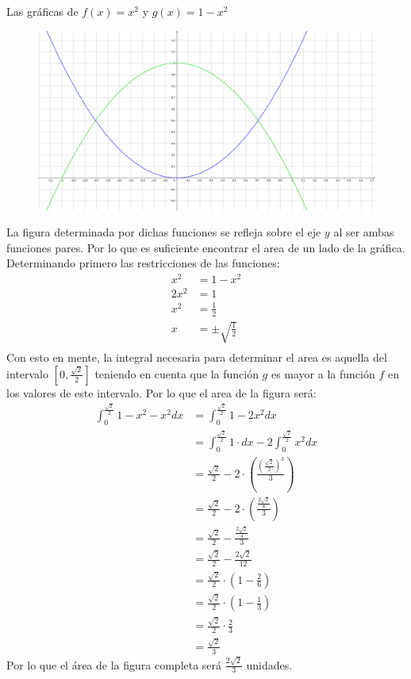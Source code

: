 \documentclass[../../main.tex]{subfiles}
\begin{document}
\begin{partes}
    \parte Las gráficas de $f(x) = x^2$ y $g(x) = 1-x^2$
    \begin{figure}[h]
        \centering
        \includegraphics[width=12cm]{Parte 1/grafica3.png}
    \end{figure} 
    La figura determinada por dichas funciones se refleja sobre el eje $y$ al ser ambas funciones pares. Por lo que es suficiente encontrar
    el area de un lado de la gráfica. Determinando primero las restricciones de las funciones:
    \begin{align*}
        x^2 &= 1-x^2\\
        2x^2 &= 1\\
        x^2 &= \frac{1}{2}\\
        x &= \pm \sqrt{\frac{1}{2}}\\
    \end{align*}
    Con esto en mente, la integral necesaria para determinar el area es aquella del intervalo $[0, \frac{\sqrt{2}}{2}]$ teniendo en cuenta que la función
    $g$ es mayor a la función $f$ en los valores de este intervalo. Por lo que el area de la figura será:
    \begin{align*}
        \int_{0}^{\frac{\sqrt{2}}{2}} 1- x^2 - x^2 dx &= \int_{0}^{\frac{\sqrt{2}}{2}} 1-2x^2 dx\\
        &= \int_{0}^{\frac{\sqrt{2}}{2}} 1 \cdot dx - 2\int_{0}^{\frac{\sqrt{2}}{2}} x^2 dx\\  
        &= \frac{\sqrt{2}}{2} - 2 \cdot \left(\frac{\left(\frac{\sqrt{2}}{2}\right)^3}{3}\right)\\
        &= \frac{\sqrt{2}}{2} - 2 \cdot \left(\frac{\frac{2\sqrt{2}}{8}}{3}\right)\\
        &= \frac{\sqrt{2}}{2} - \frac{\frac{2\sqrt{2}}{4}}{3}\\
        &= \frac{\sqrt{2}}{2} - \frac{2\sqrt{2}}{12}\\
        &= \frac{\sqrt{2}}{2} \cdot \left(1 - \frac{2}{6}\right)\\
        &= \frac{\sqrt{2}}{2} \cdot \left(1 - \frac{1}{3}\right)\\
        &= \frac{\sqrt{2}}{2} \cdot \frac{2}{3}\\
        &= \frac{\sqrt{2}}{3}
    \end{align*}
    Por lo que el área de la figura completa será $\frac{2\sqrt{2}}{3}$ unidades.\\


\end{partes}
\end{document}
